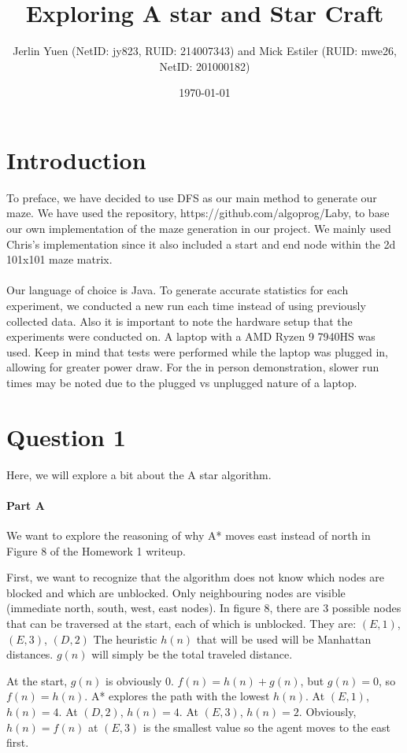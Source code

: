 \documentclass{article}
\title{Exploring A star and Star Craft}
\author{Jerlin Yuen (NetID: jy823, RUID: 214007343) and Mick Estiler (RUID: mwe26, NetID: 201000182)}
\date{\today} %
\begin{document}
\maketitle

\section{Introduction}
To preface, we have decided to use DFS as our main method to generate our maze. We have used the repository, https://github.com/algoprog/Laby, to base our own implementation of the maze generation in our project. We mainly used Chris's implementation since it also included a start and end node within the 2d 101x101 maze matrix.
\\
\\
Our language of choice is Java. To generate accurate statistics for each experiment, we conducted a new run each time instead of using previously collected data.  Also it is important to note the hardware setup that the experiments were conducted on. A laptop with a AMD Ryzen 9 7940HS was used. Keep in mind that tests were performed while the laptop was plugged in, allowing for greater power draw. For the in person demonstration, slower run times may be noted due to the plugged vs unplugged nature of a laptop. 

\section{Question 1}
Here, we will explore a bit about the A star algorithm.

\paragraph{Part A}

We want to explore the reasoning of why A* moves east instead of north in Figure 8 of the Homework 1 writeup.

First, we want to recognize that the algorithm does not know which nodes are blocked and which are unblocked. Only neighbouring nodes are visible (immediate north, south, west, east nodes). In figure 8, there are 3 possible nodes that can be traversed at the start, each of which is unblocked. They are: \((E, 1)\), \((E, 3)\), \((D, 2)\) The heuristic \(h(n)\) that will be used will be Manhattan distances. \(g(n)\) will simply be the total traveled distance. 

At the start, \(g(n)\) is obviously 0. \(f(n) = h(n) + g(n)\), but \(g(n) = 0\), so \(f(n) = h(n)\). A* explores the path with the lowest \(h(n)\). At \((E,1)\), \(h(n) = 4\). At \((D,2)\), \(h(n) = 4\). At \((E,3)\), \(h(n) = 2\). Obviously, \(h(n) = f(n)\) at \((E,3)\) is the smallest value so the agent moves to the east first.
\end{document}
